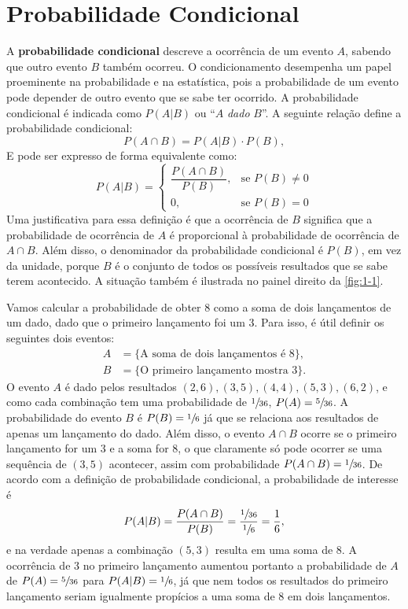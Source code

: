\section{Probabilidade Condicional}

A \textbf{probabilidade condicional} descreve a ocorrência de um evento $A$, sabendo que outro evento $B$ também ocorreu. O condicionamento desempenha um papel proeminente na probabilidade e na estatística, pois a probabilidade de um evento pode depender de outro evento que se sabe ter ocorrido. A probabilidade condicional é indicada como  $P(A|B)$ ou ``$A$ \textit{dado} $B$''. A seguinte relação define a probabilidade condicional:
\begin{equation}\label{1.6}
P(A \cap B) = P(A | B) \cdot P(B), 
\end{equation}
E pode ser expresso de forma equivalente como:
\begin{equation}
P(A|B) = \begin{cases} \dfrac{P(A \cap B)}{P(B)}, & \text{se } P(B) \neq 0 \\ 0, & \text{se } P(B) = 0 \end{cases}  
\end{equation}
Uma justificativa para essa definição é que a ocorrência de $B$ significa que a probabilidade de ocorrência de $A$ é proporcional à probabilidade de ocorrência de $A \cap B$. Além disso, o denominador da probabilidade condicional é $P(B)$, em vez da unidade, porque $B$ é o conjunto de todos os possíveis resultados que se sabe terem acontecido. A situação também é ilustrada no painel direito da \autoref{fig:1-1}.

\begin{exemplo}{}{}
Vamos calcular a probabilidade de obter 8 como a soma de dois lançamentos de um dado, dado que o primeiro lançamento foi um 3. Para isso, é útil definir os seguintes dois eventos:
\begin{align*}
	A &= \{ \text{A soma de dois lançamentos é 8} \}, \\
	B &= \{ \text{O primeiro lançamento mostra 3} \}.
\end{align*}
O evento $A$ é dado pelos resultados $(2,6), (3,5), (4,4), (5,3), (6,2)$, e como cada combinação tem uma probabilidade de $\sfrac{1}{36}$, $P(A) = \sfrac{5}{36}$. A probabilidade do evento $B$ é $P(B) = \sfrac{1}{6}$ já que se relaciona aos resultados de apenas um lançamento do dado. Além disso, o evento $A \cap B$ ocorre se o primeiro lançamento for um 3 e a soma for 8, o que claramente só pode ocorrer se uma sequência de $(3,5)$ acontecer, assim com probabilidade $P(A \cap B) = \sfrac{1}{36}$. De acordo com a definição de probabilidade condicional, a probabilidade de interesse é 
\begin{equation*}
	P(A|B) = \dfrac{P(A \cap B)}{P(B)} = \dfrac{\sfrac{1}{36}}{\sfrac{1}{6}} = \frac{1}{6},
\end{equation*}
e na verdade apenas a combinação $(5,3)$ resulta em uma soma de 8. A ocorrência de 3 no primeiro lançamento aumentou portanto a probabilidade de $A$ de $P(A) = \sfrac{5}{36}$ para $P(A|B) = \sfrac{1}{6}$, já que nem todos os resultados do primeiro lançamento seriam igualmente propícios a uma soma de 8 em dois lançamentos. 
\end{exemplo}

